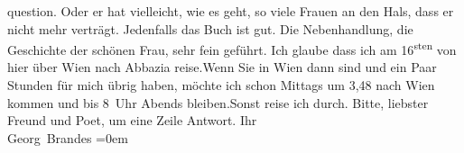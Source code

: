 \begin{ledgroupsized}[t]{13cm}
{                  question}{}\label{K_L01116-1h}. Oder er hat
               vielleicht, wie es geht, so viele Frauen an den Hals, dass er nicht mehr verträgt.
               Jedenfalls {\pb}das Buch ist gut. Die Nebenhandlung, die
               Geschichte der schönen Frau, sehr fein geführt.\pend
           \pstart
           Ich glaube dass ich am 16\textsuperscript{sten} von hier über Wien nach Abbazia reise.\hspace*{1.5em}Wenn Sie in Wien dann sind und ein Paar Stunden
               für mich übrig haben, möchte ich schon Mittags um 3,48 nach Wien kommen und bis 8 Uhr Abends
                  bleiben.\hspace*{1.5em}Sonst reise ich durch.\pend
           \pstart
           Bitte, liebster Freund und Poet, um eine Zeile Antwort.\pend
           \pstart
           Ihr{\\[\baselineskip]}\spacefill\mbox{Georg Brandes}\pend
           \leftskip=0em{}
         
         \endnumbering{}\end{ledgroupsized}  \newcommand{\dateiname}{L01116}\newcommand{\titel}{Georg Brandes an Arthur Schnitzler, 10. 5. [1901]}\newcommand{\editorInnen}{Martin Anton Müller und Gerd-Hermann Susen}
      